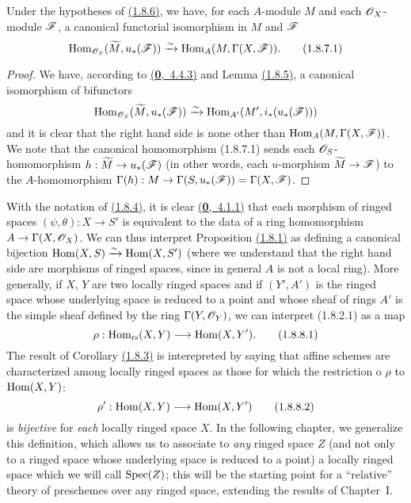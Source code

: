 \begin{cor}[1.8.7]
\label{cor-1.1.8.7}
Under the hypotheses of \hyperref[cor-1.1.8.6]{(1.8.6)}, we have, for each $A$-module $M$ and each
$\mathscr{O}_X$-module $\mathscr{F}$, a canonical functorial isomorphism in $M$ and $\mathscr{F}$
\[
  {\mathop{\mathrm{Hom}}\nolimits}_{\mathscr{O}_S}(\widetilde{M},u_*(\mathscr{F}))\xrightarrow{\sim}{\mathop{\mathrm{Hom}}\nolimits}_A(M,\Gamma(X,\mathscr{F})).
  \tag{1.8.7.1}
\]
\end{cor}

\begin{proof}
\label{proof-cor-1.1.8.7}
We have, according to \hyperref[env-0.4.4.3]{(\textbf{0},~4.4.3)} and Lemma \hyperref[lem-1.1.8.5]{(1.8.5)}, a canonical
isomorphism of bifunctors
\[
  {\mathop{\mathrm{Hom}}\nolimits}_{\mathscr{O}_S}(\widetilde{M},u_*(\mathscr{F}))\xrightarrow{\sim}{\mathop{\mathrm{Hom}}\nolimits}_{A'}(M',i_*(u_*(\mathscr{F})))
\]
and it is clear that the right hand side is none other than ${\mathop{\mathrm{Hom}}\nolimits}_A(M,\Gamma(X,\mathscr{F}))$. We
note that the canonical homomorphism (1.8.7.1) sends each $\mathscr{O}_S$-homomorphism
$h:\widetilde{M}\to u_*(\mathscr{F})$ (in other words, each $u$-morphism $\widetilde{M}\to\mathscr{F}$)
to the $A$-homomorphism $\Gamma(h):M\to\Gamma(S,u_*(\mathscr{F}))=\Gamma(X,\mathscr{F})$.
\end{proof}

\begin{env}[1.8.8]
\label{env-1.1.8.8}
With the notation of \hyperref[env-1.1.8.4]{(1.8.4)}, it is clear \hyperref[env-0.4.1.1]{(\textbf{0},~4.1.1)} that each morphism
of ringed spaces $(\psi,\theta):X\to S'$ is equivalent to the data of a ring homomorphism
$A\to\Gamma(X,\mathscr{O}_X)$. We can thus interpret Proposition \hyperref[prop-1.1.8.1]{(1.8.1)} as defining a canonical
bijection ${\mathop{\mathrm{Hom}}\nolimits}(X,S)\xrightarrow{\sim}{\mathop{\mathrm{Hom}}\nolimits}(X,S')$ (where we understand that the right hand side are
morphisms of ringed spaces, since in general $A$ is not a local ring). More generally, if
$X$, $Y$ are two locally ringed spaces and if $(Y',A')$ is the ringed space whose underlying
space is reduced to a point and whose sheaf of rings $A'$ is the simple sheaf defined by the
ring $\Gamma(Y,\mathscr{O}_Y)$, we can interpret (1.8.2.1) as a map
\[
  \rho:{\mathop{\mathrm{Hom}}\nolimits}_\text{rs}(X,Y)\longrightarrow{\mathop{\mathrm{Hom}}\nolimits}(X,Y').
  \tag{1.8.8.1}
\]
The result of Corollary \hyperref[cor-1.1.8.3]{(1.8.3)} is interepreted by saying that affine schemes are
characterized among locally ringed spaces as those for which the restriction o $\rho$ to
${\mathop{\mathrm{Hom}}\nolimits}(X,Y)$:
\[
  \rho':{\mathop{\mathrm{Hom}}\nolimits}(X,Y)\longrightarrow{\mathop{\mathrm{Hom}}\nolimits}(X,Y')
  \tag{1.8.8.2}
\]
is {\it bijective} for {\it each} locally ringed space $X$. In the following chapter, we
generalize this definition, which allows us to associate to {\it any} ringed space $Z$ (and
not only to a ringed space whose underlying space is reduced to a point) a locally ringed
space which we will call ${\mathop{\mathrm{Spec}}\nolimits}(Z)$; this will be the starting point for a ``relative''
theory of preschemes over any ringed space, extending the results of Chapter~I.
\end{env}

